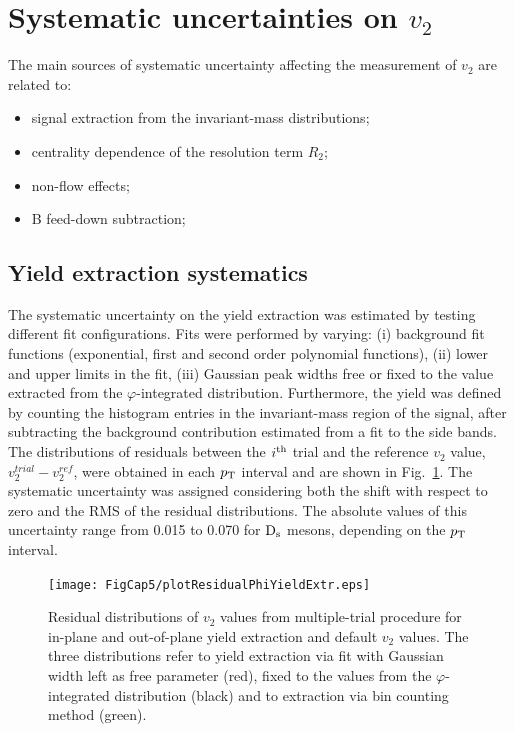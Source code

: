 \section{Systematic uncertainties on $v_2$}
\label{sec:systsectionV2}
The main sources of systematic uncertainty affecting the measurement of 
$v_2$ are related to: 
\begin{itemize}
\item signal extraction from the invariant-mass
distributions;
\item centrality dependence of the resolution term $R_2$;
\item non-flow effects;
\item B feed-down subtraction;
\end{itemize}

\subsection{Yield extraction systematics}
\label{sec:rawYv2}
The systematic uncertainty on the yield extraction was 
estimated by testing different fit configurations.
Fits were performed by varying: (i) background fit functions
(exponential, first and second order polynomial functions), 
(ii) lower and upper limits in the fit, (iii) Gaussian peak widths free or fixed to the value
extracted from the $\varphi$-integrated distribution. Furthermore, the yield was defined by
counting the histogram entries in the invariant-mass region of the signal, after subtracting the background
contribution estimated from a fit to the side bands. The distributions of
residuals between the $i^{\rm th}$ trial and the reference $v_2$ value, 
$v_2^{trial}-v_2^{ref}$, were obtained in each $p_{\rm T}$ interval and are shown in Fig.~\ref{fig:residualsV2}. 
The systematic uncertainty was assigned
considering both the shift with respect to zero and the RMS of the residual
distributions. The absolute values of this uncertainty range from 
0.015 to 0.070 for ${\rm D_s}$ mesons, depending on the $p_{\rm T}$ interval.
\begin{figure}
\centering
  \texttt{[image: FigCap5/plotResidualPhiYieldExtr.eps]}
\caption{Residual distributions of $v_2$ values from multiple-trial procedure for in-plane and out-of-plane yield extraction and default $v_2$ values. The three distributions refer to yield extraction via fit with Gaussian width left as free parameter (red), fixed to the values from the $\varphi$-integrated distribution (black) and to extraction via bin counting method (green).}
\label{fig:residualsV2}
\end{figure}

